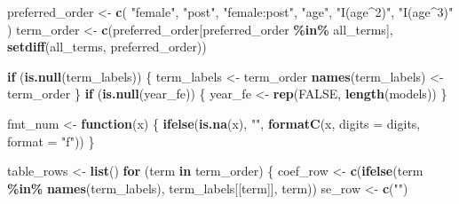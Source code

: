 \documentclass[
]{article}
\newenvironment{Shaded}{\begin{snugshade}}{\end{snugshade}}
\newcommand{\AttributeTok}[1]{\textcolor[rgb]{0.13,0.29,0.53}{#1}}
\newcommand{\ConstantTok}[1]{\textcolor[rgb]{0.56,0.35,0.01}{#1}}
\newcommand{\ControlFlowTok}[1]{\textcolor[rgb]{0.13,0.29,0.53}{\textbf{#1}}}
\newcommand{\FunctionTok}[1]{\textcolor[rgb]{0.13,0.29,0.53}{\textbf{#1}}}
\newcommand{\NormalTok}[1]{#1}
\newcommand{\OtherTok}[1]{\textcolor[rgb]{0.56,0.35,0.01}{#1}}
\newcommand{\SpecialCharTok}[1]{\textcolor[rgb]{0.81,0.36,0.00}{\textbf{#1}}}
\newcommand{\StringTok}[1]{\textcolor[rgb]{0.31,0.60,0.02}{#1}}
\begin{document}
\begin{Shaded}
\begin{Highlighting}[]
\NormalTok{    preferred\_order }\OtherTok{\textless{}{-}} \FunctionTok{c}\NormalTok{(}
        \StringTok{"female"}\NormalTok{,}
        \StringTok{"post"}\NormalTok{,}
        \StringTok{"female:post"}\NormalTok{,}
        \StringTok{"age"}\NormalTok{,}
        \StringTok{"I(age\^{}2)"}\NormalTok{,}
        \StringTok{"I(age\^{}3)"}
\NormalTok{    )}
\NormalTok{    term\_order }\OtherTok{\textless{}{-}} \FunctionTok{c}\NormalTok{(preferred\_order[preferred\_order }\SpecialCharTok{\%in\%}\NormalTok{ all\_terms], }\FunctionTok{setdiff}\NormalTok{(all\_terms, preferred\_order))}

    \ControlFlowTok{if}\NormalTok{ (}\FunctionTok{is.null}\NormalTok{(term\_labels)) \{}
\NormalTok{        term\_labels }\OtherTok{\textless{}{-}}\NormalTok{ term\_order}
        \FunctionTok{names}\NormalTok{(term\_labels) }\OtherTok{\textless{}{-}}\NormalTok{ term\_order}
\NormalTok{    \}}
    \ControlFlowTok{if}\NormalTok{ (}\FunctionTok{is.null}\NormalTok{(year\_fe)) \{}
\NormalTok{        year\_fe }\OtherTok{\textless{}{-}} \FunctionTok{rep}\NormalTok{(}\ConstantTok{FALSE}\NormalTok{, }\FunctionTok{length}\NormalTok{(models))}
\NormalTok{    \}}

\NormalTok{    fmt\_num }\OtherTok{\textless{}{-}} \ControlFlowTok{function}\NormalTok{(x) \{}
        \FunctionTok{ifelse}\NormalTok{(}\FunctionTok{is.na}\NormalTok{(x), }\StringTok{""}\NormalTok{, }\FunctionTok{formatC}\NormalTok{(x, }\AttributeTok{digits =}\NormalTok{ digits, }\AttributeTok{format =} \StringTok{"f"}\NormalTok{))}
\NormalTok{    \}}

\NormalTok{    table\_rows }\OtherTok{\textless{}{-}} \FunctionTok{list}\NormalTok{()}
    \ControlFlowTok{for}\NormalTok{ (term }\ControlFlowTok{in}\NormalTok{ term\_order) \{}
\NormalTok{        coef\_row }\OtherTok{\textless{}{-}} \FunctionTok{c}\NormalTok{(}\FunctionTok{ifelse}\NormalTok{(term }\SpecialCharTok{\%in\%} \FunctionTok{names}\NormalTok{(term\_labels), term\_labels[[term]], term))}
\NormalTok{        se\_row }\OtherTok{\textless{}{-}} \FunctionTok{c}\NormalTok{(}\StringTok{""}\NormalTok{)}


\end{Highlighting}
\end{Shaded}
\end{document}

